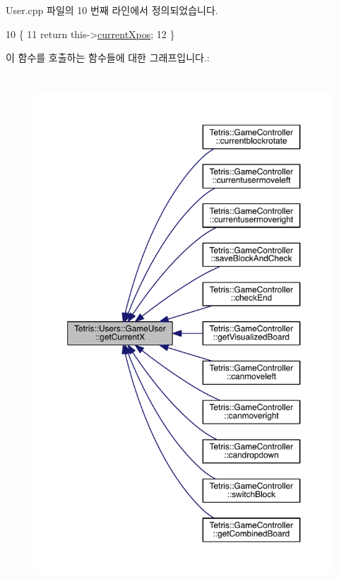User.\+cpp 파일의 10 번째 라인에서 정의되었습니다.


\begin{DoxyCode}
10                                             \{
11                     \textcolor{keywordflow}{return} this->\hyperlink{class_tetris_1_1_users_1_1_game_user_a3edcace8f88494f9cee4ba99ba9b6c87}{currentXpos};
12                 \}
\end{DoxyCode}
이 함수를 호출하는 함수들에 대한 그래프입니다.\+:
\nopagebreak
\begin{figure}[H]
\begin{center}
\leavevmode
\includegraphics[height=550pt]{d8/d9a/class_tetris_1_1_users_1_1_game_user_ad25eace96bd27ae6df4a0c0d506be730_icgraph}
\end{center}
\end{figure}
\mbox{\label{class_tetris_1_1_users_1_1_game_user_ad25eace96bd27ae6df4a0c0d506be730}} 
